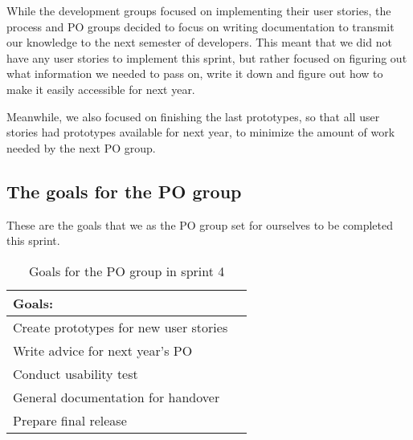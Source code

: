 While the development groups focused on implementing their user stories, the process and PO groups decided to focus on writing documentation to transmit our knowledge to the next semester of developers.
This meant that we did not have any user stories to implement this sprint, but rather focused on figuring out what information we needed to pass on, write it down and figure out how to make it easily accessible for next year.

Meanwhile, we also focused on finishing the last prototypes, so that all user stories had prototypes available for next year, to minimize the amount of work needed by the next PO group.

\subsection{The goals for the PO group}\label{subsec:sprint-4-PO-goals}
These are the goals that we as the PO group set for ourselves to be completed this sprint.
\begin{table}[H]
    \centering
    \begin{tabular}{|l|l|}
    \hline
    Goals:  \\ \hline
     Create prototypes for new user stories \\ \hline
     Write advice for next year's PO \\ \hline
     Conduct usability test \\ \hline
     General documentation for handover \\ \hline
     Prepare final release \\ \hline
    \end{tabular}
    \caption{Goals for the PO group in sprint 4}
\end{table}